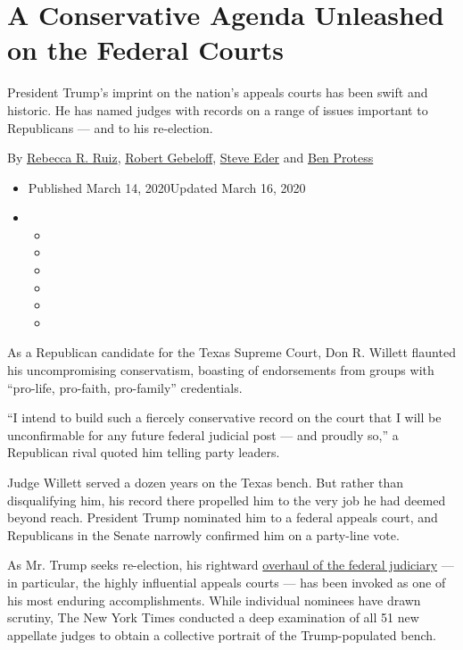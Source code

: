 \hypertarget{a-conservative-agenda-unleashed-on-the-federal-courts}{%
\section{A Conservative Agenda Unleashed on the Federal
Courts}\label{a-conservative-agenda-unleashed-on-the-federal-courts}}

President Trump's imprint on the nation's appeals courts has been swift
and historic. He has named judges with records on a range of issues
important to Republicans --- and to his re-election.

By \href{https://www.nytimes3xbfgragh.onion/by/rebecca-r-ruiz}{Rebecca
R. Ruiz},
\href{https://www.nytimes3xbfgragh.onion/by/robert-gebeloff}{Robert
Gebeloff}, \href{https://www.nytimes3xbfgragh.onion/by/steve-eder}{Steve
Eder} and \href{https://www.nytimes3xbfgragh.onion/by/ben-protess}{Ben
Protess}

\begin{itemize}
\item
  Published March 14, 2020Updated March 16, 2020
\item
  \begin{itemize}
  \item
  \item
  \item
  \item
  \item
  \item
  \end{itemize}
\end{itemize}

As a Republican candidate for the Texas Supreme Court, Don R. Willett
flaunted his uncompromising conservatism, boasting of endorsements from
groups with ``pro-life, pro-faith, pro-family'' credentials.

``I intend to build such a fiercely conservative record on the court
that I will be unconfirmable for any future federal judicial post ---
and proudly so,'' a Republican rival quoted him telling party leaders.

Judge Willett served a dozen years on the Texas bench. But rather than
disqualifying him, his record there propelled him to the very job he had
deemed beyond reach. President Trump nominated him to a federal appeals
court, and Republicans in the Senate narrowly confirmed him on a
party-line vote.

As Mr. Trump seeks re-election, his rightward
\href{https://www.nytimes3xbfgragh.onion/2020/06/29/us/politics/supreme-court-trump-biden.html}{overhaul
of the federal judiciary} --- in particular, the highly influential
appeals courts --- has been invoked as one of his most enduring
accomplishments. While individual nominees have drawn scrutiny, The New
York Times conducted a deep examination of all 51 new appellate judges
to obtain a collective portrait of the Trump-populated bench.

